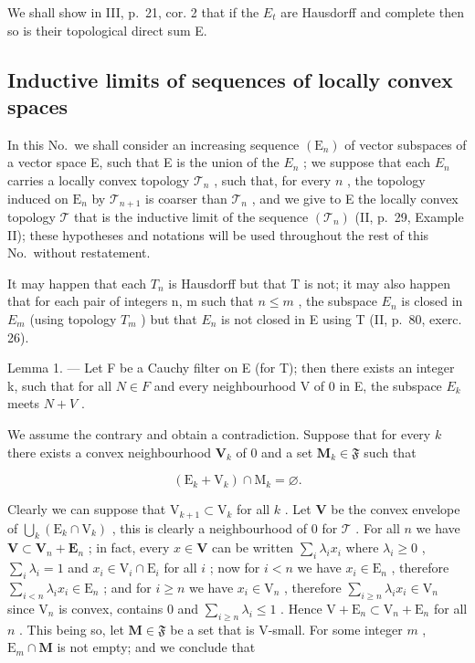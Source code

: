 We shall show in III, p.~21, cor. 2 that if the \(E_{t}\) are Hausdorff and complete then so is their topological direct sum E.

\subsection{Inductive limits of sequences of locally convex spaces}

In this No.~we shall consider an increasing sequence \((\mathrm{E}_{n})\) of vector subspaces of a vector space E, such that E is the union of the \(E_{n}\) ; we suppose that each \(E_{n}\) carries a locally convex topology \(\mathcal{T}_n\) , such that, for every \(n\) , the topology induced on \(\mathrm{E}_n\) by \(\mathcal{T}_{n+1}\) is coarser than \(\mathcal{T}_n\) , and we give to E the locally convex topology \(\mathcal{T}\) that is the inductive limit of the sequence \((\mathcal{T}_n)\) (II, p.~29, Example II); these hypotheses and notations will be used throughout the rest of this No.~without restatement.

It may happen that each \(T_{n}\) is Hausdorff but that T is not; it may also happen that for each pair of integers n, m such that \(n \leqslant m\) , the subspace \(E_{n}\) is closed in \(E_{m}\) (using topology \(T_{m}\) ) but that \(E_{n}\) is not closed in E using T (II, p.~80, exerc. 26).

Lemma 1. --- Let F be a Cauchy filter on E (for T); then there exists an integer k, such that for all \(N \in F\) and every neighbourhood V of 0 in E, the subspace \(E_{k}\) meets \(N + V\) .

We assume the contrary and obtain a contradiction. Suppose that for every \(k\) there exists a convex neighbourhood \(\mathbf{V}_k\) of 0 and a set \(\mathbf{M}_k \in \mathfrak{F}\) such that

\[
\left(\mathrm{E} _ {k} + \mathrm{V} _ {k}\right) \cap \mathrm{M} _ {k} = \varnothing .
\]

Clearly we can suppose that \(\mathrm{V}_{k + 1} \subset \mathrm{V}_k\) for all \(k\) . Let \(\mathbf{V}\) be the convex envelope of \(\bigcup_{k} (\mathrm{E}_k \cap \mathrm{V}_k)\) , this is clearly a neighbourhood of 0 for \(\mathcal{T}\) . For all \(n\) we have \(\mathbf{V} \subset \mathbf{V}_n + \mathbf{E}_n\) ; in fact, every \(x \in \mathbf{V}\) can be written \(\sum_{i} \lambda_i x_i\) where \(\lambda_i \geqslant 0\) , \(\sum_{i} \lambda_i = 1\) and \(x_i \in \mathrm{V}_i \cap \mathrm{E}_i\) for all \(i\) ; now for \(i < n\) we have \(x_i \in \mathrm{E}_n\) , therefore \(\sum_{i < n} \lambda_i x_i \in \mathrm{E}_n\) ; and for \(i \geqslant n\) we have \(x_i \in \mathrm{V}_n\) , therefore \(\sum_{i \geqslant n} \lambda_i x_i \in \mathrm{V}_n\) since \(\mathrm{V}_n\) is convex, contains 0 and \(\sum_{i \geqslant n} \lambda_i \leqslant 1\) . Hence \(\mathrm{V} + \mathrm{E}_n \subset \mathrm{V}_n + \mathrm{E}_n\) for all \(n\) . This being so, let \(\mathbf{M} \in \mathfrak{F}\) be a set that is V-small. For some integer \(m\) , \(\mathrm{E}_m \cap \mathbf{M}\) is not empty; and we conclude that

